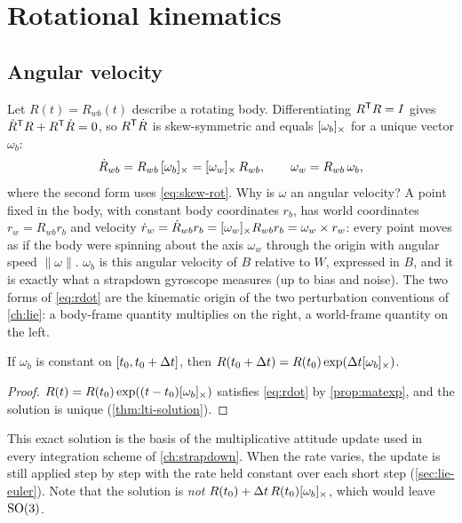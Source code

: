 \section{Rotational kinematics}
\label{sec:rot-kinematics}

\subsection{Angular velocity}

Let $R(t) = R_{wb}(t)$ describe a rotating body. Differentiating $R^{\mathsf{T}} R = I$ gives $\dot R^{\mathsf{T}} R + R^{\mathsf{T}}\dot R = 0$, so $R^{\mathsf{T}}\dot R$ is skew-symmetric and
equals $[\omega_b]_{\times}$ for a unique vector $\omega_b$:
\begin{equation}
  \dot R_{wb} = R_{wb}\,[\omega_b]_{\times} = [\omega_w]_{\times}\,R_{wb}, \qquad \omega_w = R_{wb}\,\omega_b ,
  \label{eq:rdot}
\end{equation}
where the second form uses \eqref{eq:skew-rot}. Why is $\omega$ an angular velocity? A point fixed in the body, with constant body coordinates $r_b$,
has world coordinates $r_w = R_{wb}r_b$ and velocity $\dot r_w = \dot R_{wb}r_b = [\omega_w]_{\times}R_{wb}r_b = \omega_w\times r_w$: every point moves as if the body
were spinning about the axis $\omega_w$ through the origin with angular speed $\|\omega\|$. $\omega_b$ is this angular velocity of $B$ relative to $W$,
expressed in $B$, and it is exactly what a strapdown gyroscope measures (up to bias and noise). The two forms of \eqref{eq:rdot} are the
kinematic origin of the two perturbation conventions of \cref{ch:lie}: a body-frame quantity multiplies on the right, a world-frame quantity on
the left.

\begin{proposition}
\label{prop:const-rate}
If $\omega_b$ is constant on $[t_0, t_0 + {\Delta t}]$, then $R(t_0 + {\Delta t}) = R(t_0)\exp({\Delta t}[\omega_b]_{\times})$.
\end{proposition}
\begin{proof}
$R(t) = R(t_0)\exp((t - t_0)[\omega_b]_{\times})$ satisfies \eqref{eq:rdot} by \cref{prop:matexp}, and the solution is unique (\cref{thm:lti-solution}).
\end{proof}

This exact solution is the basis of the multiplicative attitude update used in every integration scheme of \cref{ch:strapdown}. When the
rate varies, the update is still applied step by step with the rate held constant over each short step (\cref{sec:lie-euler}). Note that the
solution is \emph{not} $R(t_0) + {\Delta t}\, R(t_0)[\omega_b]_{\times}$, which would leave $\mathrm{SO}(3)$.

